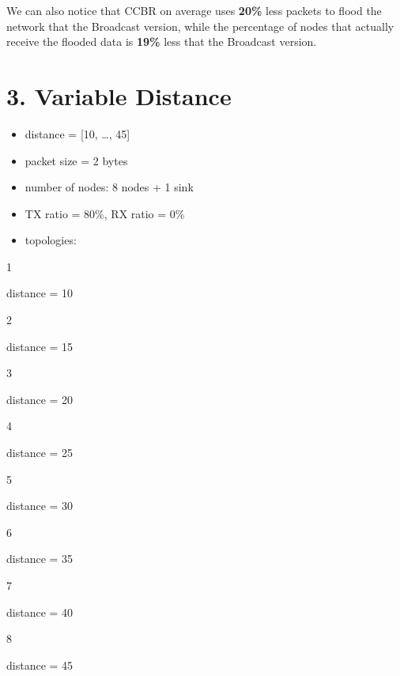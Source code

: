 \documentclass[11pt]{article}
\providecommand{\tightlist}{%
      \setlength{\itemsep}{0pt}\setlength{\parskip}{0pt}}
\begin{document}
We can also notice that CCBR on average uses \textbf{20\%} less packets
to flood the network that the Broadcast version, while the percentage of
nodes that actually receive the flooded data is \textbf{19\%} less that
the Broadcast version.

    \hypertarget{variable-distance}{%
\section{3. Variable Distance}\label{variable-distance}}

\begin{itemize}
\tightlist
\item
  distance = {[}10, \ldots{}, 45{]}
\item
  packet size = 2 bytes
\item
  number of nodes: 8 nodes + 1 sink
\item
  TX ratio = 80\%, RX ratio = 0\%
\item
  topologies:
\end{itemize}

1

distance = 10

2

distance = 15

3

distance = 20

4

distance = 25

5

distance = 30

6

distance = 35

7

distance = 40

8

distance = 45
\end{document}
